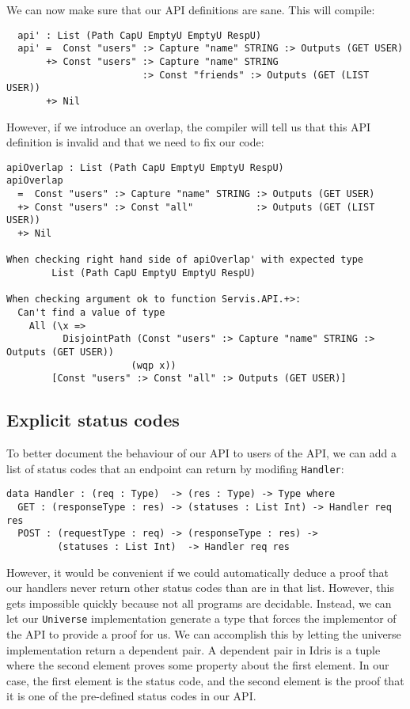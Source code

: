 \documentclass[12pt,a4paper]{article}
\begin{document}
We can now make sure that our API definitions are sane. This will compile:
\begin{verbatim}
  api' : List (Path CapU EmptyU EmptyU RespU)
  api' =  Const "users" :> Capture "name" STRING :> Outputs (GET USER)
       +> Const "users" :> Capture "name" STRING
                        :> Const "friends" :> Outputs (GET (LIST USER))
       +> Nil
\end{verbatim}

However, if we introduce an overlap, the compiler will tell us that this
API definition is invalid and that we need to fix our code:
\begin{verbatim}
apiOverlap : List (Path CapU EmptyU EmptyU RespU)
apiOverlap
  =  Const "users" :> Capture "name" STRING :> Outputs (GET USER)
  +> Const "users" :> Const "all"           :> Outputs (GET (LIST USER))
  +> Nil

When checking right hand side of apiOverlap' with expected type
        List (Path CapU EmptyU EmptyU RespU)

When checking argument ok to function Servis.API.+>:
  Can't find a value of type 
    All (\x =>
          DisjointPath (Const "users" :> Capture "name" STRING :> Outputs (GET USER))
                      (wqp x))
        [Const "users" :> Const "all" :> Outputs (GET USER)]
\end{verbatim}

\subsection{Explicit status codes}
To better document the behaviour of our API to users of the API, we can add a list of status codes that an endpoint can return by modifing \texttt{Handler}:

\begin{verbatim}
data Handler : (req : Type)  -> (res : Type) -> Type where
  GET : (responseType : res) -> (statuses : List Int) -> Handler req res
  POST : (requestType : req) -> (responseType : res) ->
         (statuses : List Int)  -> Handler req res
\end{verbatim}

However, it would be convenient if we could automatically deduce a proof that our handlers never return
other status codes than are in that list. However, this gets impossible quickly because not all programs are decidable.
Instead, we can let our \texttt{Universe} implementation generate a type that forces the implementor of the API to provide a proof for us. We can accomplish this by letting the universe implementation return a dependent pair. A dependent pair in Idris is a tuple where the second element proves some property about the first element. In our case, the first element is the status code, and the second element is the proof that it is one of the pre-defined status codes in our API.
\end{document}
